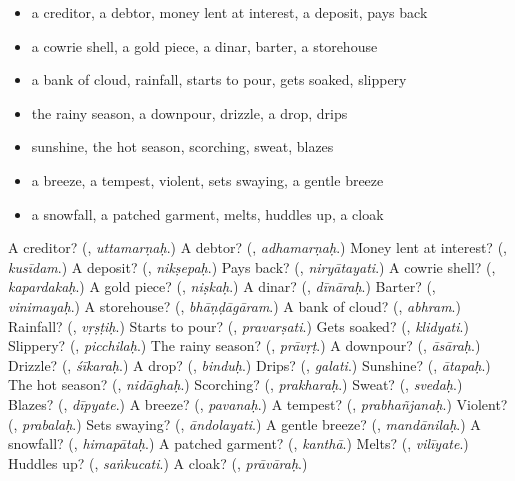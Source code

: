 \begin{itemize}
\raggedright
  \item a creditor, a debtor, money lent at interest, a deposit, pays back
  \item a cowrie shell, a gold piece, a dinar, barter, a storehouse
  \item a bank of cloud, rainfall, starts to pour, gets soaked, slippery
  \item the rainy season, a downpour, drizzle, a drop, drips
  \item sunshine, the hot season, scorching, sweat, blazes
  \item a breeze, a tempest, violent, sets swaying, a gentle breeze
  \item a snowfall, a patched garment, melts, huddles up, a cloak
\end{itemize}

\begin{tcolorbox}[breakable,colback=teal!4,colframe=teal!35!black,title={Before you move on}]
A creditor? (\textbf{}, \emph{uttamarṇaḥ}.) A debtor? (\textbf{}, \emph{adhamarṇaḥ}.) Money lent at interest? (\textbf{}, \emph{kusīdam}.) A deposit? (\textbf{}, \emph{nikṣepaḥ}.) Pays back? (\textbf{}, \emph{niryātayati}.) A cowrie shell? (\textbf{}, \emph{kapardakaḥ}.) A gold piece? (\textbf{}, \emph{niṣkaḥ}.) A dinar? (\textbf{}, \emph{dīnāraḥ}.) Barter? (\textbf{}, \emph{vinimayaḥ}.) A storehouse? (\textbf{}, \emph{bhāṇḍāgāram}.) A bank of cloud? (\textbf{}, \emph{abhram}.) Rainfall? (\textbf{}, \emph{vṛṣṭiḥ}.) Starts to pour? (\textbf{}, \emph{pravarṣati}.) Gets soaked? (\textbf{}, \emph{klidyati}.) Slippery? (\textbf{}, \emph{picchilaḥ}.) The rainy season? (\textbf{}, \emph{prāvṛṭ}.) A downpour? (\textbf{}, \emph{āsāraḥ}.) Drizzle? (\textbf{}, \emph{śīkaraḥ}.) A drop? (\textbf{}, \emph{binduḥ}.) Drips? (\textbf{}, \emph{galati}.) Sunshine? (\textbf{}, \emph{ātapaḥ}.) The hot season? (\textbf{}, \emph{nidāghaḥ}.) Scorching? (\textbf{}, \emph{prakharaḥ}.) Sweat? (\textbf{}, \emph{svedaḥ}.) Blazes? (\textbf{}, \emph{dīpyate}.) A breeze? (\textbf{}, \emph{pavanaḥ}.) A tempest? (\textbf{}, \emph{prabhañjanaḥ}.) Violent? (\textbf{}, \emph{prabalaḥ}.) Sets swaying? (\textbf{}, \emph{āndolayati}.) A gentle breeze? (\textbf{}, \emph{mandānilaḥ}.) A snowfall? (\textbf{}, \emph{himapātaḥ}.) A patched garment? (\textbf{}, \emph{kanthā}.) Melts? (\textbf{}, \emph{vilīyate}.) Huddles up? (\textbf{}, \emph{saṅkucati}.) A cloak? (\textbf{}, \emph{prāvāraḥ}.)
\end{tcolorbox}
